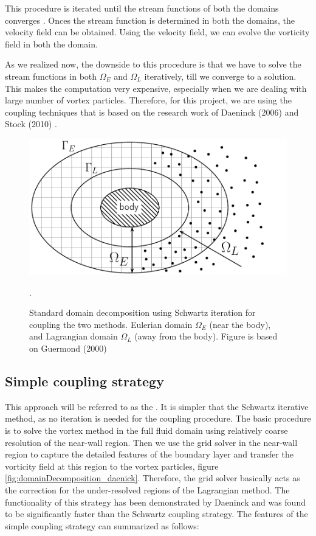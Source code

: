 This procedure is iterated until the stream functions of both the domains converges \cite{Ould-Salihi2001}. Onces the stream function is determined in both the domains, the velocity field can be obtained. Using the velocity field, we can evolve the vorticity field in both the domain. 

As we realized now, the downside to this procedure is that we have to solve the stream functions in both $\Omega_E$ and $\Omega_L$ iteratively, till we converge to a solution. This makes the computation very expensive, especially when we are dealing with large number of vortex particles. Therefore, for this project, we are using the coupling techniques that is based on the research work of Daeninck (2006) \cite{Daeninck2006} and Stock (2010) \cite{Stock}.

	\begin{figure}[!t]
		\centering
		\includegraphics[width=0.6\linewidth]{figures/introduction/domainDecomposition_typical_type2.pdf}
		\caption{Standard domain decomposition using Schwartz iteration for coupling the two methods. Eulerian domain $\Omega_E$ (near the body), and Lagrangian domain $\Omega_L$ (away from the body). Figure is based on Guermond (2000) \cite{Guermond2000}}.
		\label{fig:domainDecomposition}
	\end{figure}

\subsection{Simple coupling strategy}
This approach will be referred to as the . It is simpler that the Schwartz iterative method, as no iteration is needed for the coupling procedure. The basic procedure is to solve the vortex method in the full fluid domain using relatively coarse resolution of the near-wall region. Then we use the grid solver in the near-wall region to capture the detailed features of the boundary layer and transfer the vorticity field at this region to the vortex particles, figure \ref{fig:domainDecomposition_daenick}. Therefore, the grid solver basically acts as the correction for the under-resolved regions of the Lagrangian method. The functionality of this strategy has been demonstrated by Daeninck and was found to be significantly faster than the Schwartz coupling strategy. The features of the simple coupling strategy can summarized as follows:

